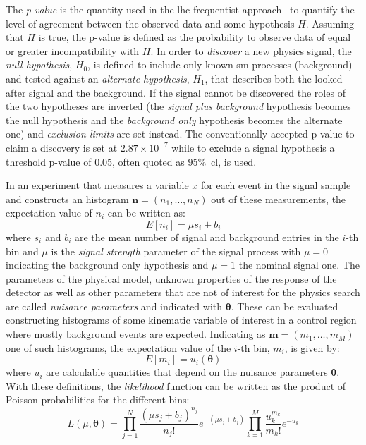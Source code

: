 The \emph{p-value} is the quantity used in the \gls{lhc} frequentist
approach~\cite{StatProcedure} to quantify the level of agreement between the
observed data and some hypothesis $H$. Assuming that $H$ is true, the p-value is
defined as the probability to observe data of equal or greater incompatibility
with $H$. In order to \emph{discover} a new physics signal, the \emph{null
  hypothesis}, $H_0$, is defined to include only known \gls{sm} processes
(background) and tested against an \emph{alternate hypothesis}, $H_1$, that
describes both the looked after signal and the background. If the signal cannot
be discovered the roles of the two hypotheses are inverted (the \emph{signal plus
  background} hypothesis becomes the null hypothesis and the \emph{background
  only} hypothesis becomes the alternate one) and \emph{exclusion limits} are
set instead. The conventionally accepted p-value to claim a discovery is set at
$2.87 \times 10^{-7}$ while to exclude a signal hypothesis a threshold p-value
of 0.05, often quoted as 95\%~\gls{cl}, is used.

In an experiment that measures a variable $x$ for each event in the signal
sample and constructs an histogram $\boldsymbol{n} = (n_1, \dots, n_N)$ out of
these measurements, the expectation value of $n_i$ can be written as:
\begin{equation}
  \label{eq:88}
  E[n_i] = \mu s_i + b_i
\end{equation}
where $s_i$ and $b_i$ are the mean number of signal and background entries in
the $i$-th bin and $\mu$ is the \emph{signal strength} parameter of the signal
process with $\mu = 0$ indicating the background only hypothesis and $\mu = 1$
the nominal signal one. The parameters of the physical model, unknown properties
of the response of the detector as well as other parameters that are not of
interest for the physics search are called \emph{nuisance parameters} and
indicated with $\boldsymbol{\theta}$. These can be evaluated constructing
histograms of some kinematic variable of interest in a control region where
mostly background events are expected. Indicating as
$\boldsymbol{m} = (m_1, \dots, m_M)$ one of such histograms, the expectation
value of the $i$-th bin, $m_i$, is given by:
\begin{equation}
  \label{eq:89}
  E[m_i] = u_i(\boldsymbol{\theta})
\end{equation}
where $u_i$ are calculable quantities that depend on the nuisance parameters
$\boldsymbol{\theta}$. With these definitions, the \emph{likelihood} function
can be written as the product of Poisson probabilities for the different bins:
\begin{equation}
  \label{eq:115}
  L(\mu, \boldsymbol{\theta}) = \prod_{j = 1}^N \frac{(\mu s_j +
    b_j)^{n_j}}{n_j!} e^{-(\mu s_j + b_j)} \prod_{k = 1}^M
  \frac{u_k^{m_k}}{m_k!} e^{-u_k}
\end{equation}

